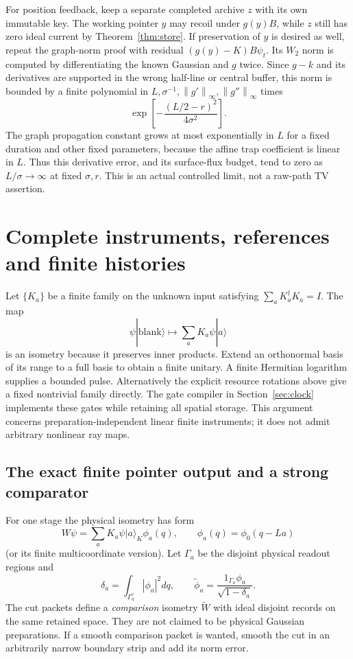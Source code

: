 \documentclass[11pt]{article}
\theoremstyle{definition}\newtheorem{assumption}[theorem]{Constitutive assumption}
\theoremstyle{remark}\newtheorem{remark}[theorem]{Remark}
\newcommand{\ket}[1]{|#1\rangle}\newcommand{\bra}[1]{\langle#1|}
\newcommand{\norm}[1]{\left\|#1\right\|}\newcommand{\pos}[1]{[#1]_+}
\begin{document}
For position feedback, keep a separate completed archive $z$ with its own immutable key. The working pointer $y$ may recoil under $g(y)B$, while $z$ still has zero ideal current by Theorem~\ref{thm:store}. If preservation of $y$ is desired as well, repeat the graph-norm proof with residual $(g(y)-K)B\psi_t$. Its $W_2$ norm is computed by differentiating the known Gaussian and $g$ twice. Since $g-k$ and its derivatives are supported in the wrong half-line or central buffer, this norm is bounded by a finite polynomial in $L,\sigma^{-1},\norm{g'}_\infty,\norm{g''}_\infty$ times
\[
 \exp\left[-\frac{(L/2-r)^2}{4\sigma^2}\right].
\]
The graph propagation constant grows at most exponentially in $L$ for a fixed duration and other fixed parameters, because the affine trap coefficient is linear in $L$. Thus this derivative error, and its surface-flux budget, tend to zero as $L/\sigma\to\infty$ at fixed $\sigma,r$. This is an actual controlled limit, not a raw-path TV assertion.

\section{Complete instruments, references and finite histories}
\label{sec:complete}
Let $\{K_a\}$ be a finite family on the unknown input satisfying $\sum_aK_a^\dagger K_a=I$. The map
\[
 \psi\ket{\mathrm{blank}}\longmapsto\sum_aK_a\psi\ket a
\]
is an isometry because it preserves inner products. Extend an orthonormal basis of its range to a full basis to obtain a finite unitary. A finite Hermitian logarithm supplies a bounded pulse. Alternatively the explicit resource rotations above give a fixed nontrivial family directly. The gate compiler in Section~\ref{sec:clock} implements these gates while retaining all spatial storage. This argument concerns preparation-independent linear finite instruments; it does not admit arbitrary nonlinear ray maps.

\subsection{The exact finite pointer output and a strong comparator}
For one stage the physical isometry has form
\begin{equation}\label{eq:W}
 W\psi=\sum_a K_a\psi\ket a_K\phi_a(q),
 \qquad\phi_a(q)=\phi_0(q-La)
\end{equation}
(or its finite multicoordinate version). Let $\Gamma_a$ be the disjoint physical readout regions and
\[
 \delta_a=\int_{\Gamma_a^c}|\phi_a|^2dq,\qquad
 \widetilde\phi_a=\frac{1_{\Gamma_a}\phi_a}{\sqrt{1-\delta_a}}.
\]
The cut packets define a \emph{comparison} isometry $\widetilde W$ with ideal disjoint records on the same retained space. They are not claimed to be physical Gaussian preparations. If a smooth comparison packet is wanted, smooth the cut in an arbitrarily narrow boundary strip and add its norm error.
\end{document}
